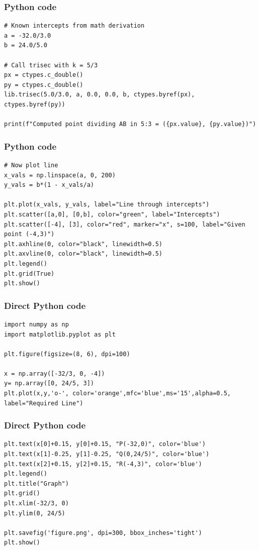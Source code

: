 \documentclass{beamer}
\begin{document}
\begin{frame}[fragile]
\frametitle{Python code}
\begin{lstlisting}
# Known intercepts from math derivation
a = -32.0/3.0
b = 24.0/5.0

# Call trisec with k = 5/3
px = ctypes.c_double()
py = ctypes.c_double()
lib.trisec(5.0/3.0, a, 0.0, 0.0, b, ctypes.byref(px), ctypes.byref(py))

print(f"Computed point dividing AB in 5:3 = ({px.value}, {py.value})")
\end{lstlisting}
\end{frame}
\begin{frame}[fragile]
\frametitle{Python code}
\begin{lstlisting}
# Now plot line
x_vals = np.linspace(a, 0, 200)
y_vals = b*(1 - x_vals/a)

plt.plot(x_vals, y_vals, label="Line through intercepts")
plt.scatter([a,0], [0,b], color="green", label="Intercepts")
plt.scatter([-4], [3], color="red", marker="x", s=100, label="Given point (-4,3)")
plt.axhline(0, color="black", linewidth=0.5)
plt.axvline(0, color="black", linewidth=0.5)
plt.legend()
plt.grid(True)
plt.show()
\end{lstlisting}
\end{frame}
\begin{frame}[fragile]
\frametitle{Direct Python code}
\begin{lstlisting}
import numpy as np
import matplotlib.pyplot as plt

plt.figure(figsize=(8, 6), dpi=100)

x = np.array([-32/3, 0, -4])
y= np.array([0, 24/5, 3])
plt.plot(x,y,'o-', color='orange',mfc='blue',ms='15',alpha=0.5, label="Required Line")
\end{lstlisting}
\end{frame}
\begin{frame}[fragile]
\frametitle{Direct Python code}
\begin{lstlisting}
plt.text(x[0]+0.15, y[0]+0.15, "P(-32,0)", color='blue')
plt.text(x[1]-0.25, y[1]-0.25, "Q(0,24/5)", color='blue')
plt.text(x[2]+0.15, y[2]+0.15, "R(-4,3)", color='blue')
plt.legend()
plt.title("Graph")
plt.grid()
plt.xlim(-32/3, 0)
plt.ylim(0, 24/5)

plt.savefig('figure.png', dpi=300, bbox_inches='tight')
plt.show()
\end{lstlisting}
\end{frame}
\end{document}
